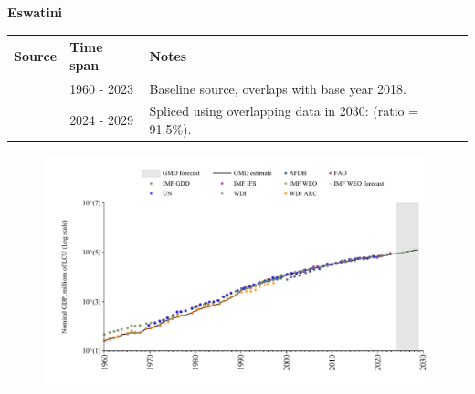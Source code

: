 \documentclass[12pt,a4paper,landscape]{article}
\begin{document}
\begin{adjustbox}{max totalsize={\paperwidth}{\paperheight},center}
\begin{minipage}[t][\textheight][t]{\textwidth}
\vspace*{0.5cm}
{}
\begin{center}
{\Large\bfseries Eswatini}
\end{center}
\vspace{0.5cm}
\begin{table}[H]
\centering
\small
\begin{tabular}{|l|l|l|}
\hline
\textbf{Source} & \textbf{Time span} & \textbf{Notes} \\
\hline
\rowcolor{white}\cite{WDI}& 1960 - 2023 &Baseline source, overlaps with base year 2018.\\
\rowcolor{lightgray}\cite{IMF_WEO_forecast}& 2024 - 2029 &Spliced using overlapping data in 2030: (ratio = 91.5\%).\\
\hline
\end{tabular}
\end{table}
\begin{figure}[H]
\centering
\includegraphics[width=\textwidth,height=0.6\textheight,keepaspectratio]{graphs/SWZ_nGDP.pdf}
\end{figure}
\end{minipage}
\end{adjustbox}
\end{document}
